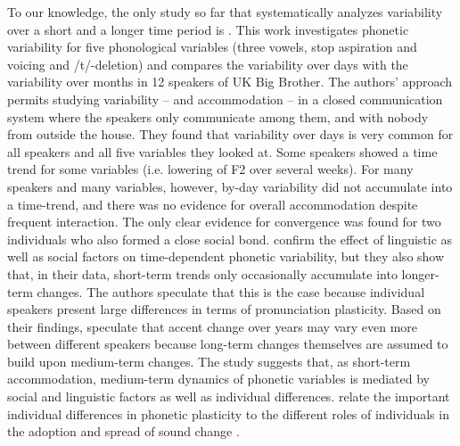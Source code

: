 \documentclass[output=paper,
modfonts
]{langscibook}
\begin{document}
To our knowledge, the only study so far that systematically analyzes variability over a short and a longer time period is \cite{sonderegger_medium-term_2017}. This work investigates phonetic variability for five phonological variables (three vowels, stop aspiration and voicing and /t/-deletion) and compares the variability over days with the variability over months in 12 speakers of UK Big Brother. The authors' approach permits studying variability – and accommodation – in a closed communication system where the speakers only communicate among them, and with nobody from outside the house. They found that variability over days is very common for all speakers and all five variables they looked at. Some speakers showed a time trend for some variables (i.e. lowering of F2 over several weeks). For many speakers and many variables, however, by-day variability did not accumulate into a time-trend, and there was no evidence for overall accommodation despite frequent interaction. The only clear evidence for convergence was found for two individuals who also formed a close social bond. \cite{sonderegger_medium-term_2017} confirm the effect of linguistic as well as social factors on time-dependent phonetic variability, but they also show that, in their data, short-term trends only occasionally accumulate into longer-term changes. The authors speculate that this is the case because individual speakers present large differences in terms of pronunciation plasticity. Based on their findings, \citet{sonderegger_medium-term_2017} speculate that accent change over years may vary even more  between different speakers because long-term changes themselves are assumed to build upon medium-term changes. The study suggests that, as short-term accommodation, medium-term dynamics of phonetic variables is mediated by social and linguistic factors as well as individual differences. \cite{sonderegger_medium-term_2017} relate the important individual differences in phonetic plasticity to the different roles of individuals in the adoption and spread of sound change \citep[reminiscent of the contrasts between early adopters and innovators;][]{milroy_linguistic_1985}.
% 
\end{document}
